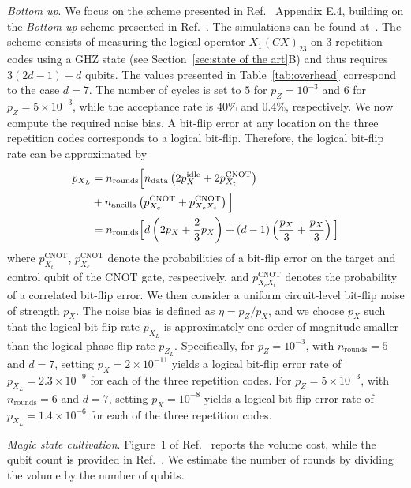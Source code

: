 \documentclass[%
 reprint,
superscriptaddress,
 amsmath,amssymb,
 aps,
]{revtex4-2}
\begin{document}
\textit{Bottom up}. We focus on the scheme presented in Ref.~\cite{gouzien2023performance} Appendix E.4, building on the \textit{Bottom-up} scheme presented in Ref.~\cite{chamberland2022building}. The simulations can be found at~\cite{CodeGithub}. The scheme consists of measuring the logical operator $X_1(CX)_{23}$ on 3 repetition codes using a GHZ state (see Section~\ref{sec:state of the art}B) and thus requires $3(2d-1)+d$ qubits. The values presented in Table~\ref{tab:overhead} correspond to the case $d=7$. The number of cycles is set to $5$ for $p_Z = 10^{-3}$ and $6$ for $p_Z = 5 \times 10^{-3}$, while the acceptance rate is $40\%$ and $0.4\%$, respectively. We now compute the required noise bias. A bit-flip error at any location on the three repetition codes corresponds to a logical bit-flip. Therefore, the logical bit-flip rate can be approximated by
\begin{align}
p_{X_L} &= n_{\text{rounds}} \Big[ 
    n_{\text{data}} \left(2p^\text{idle}_X + 2p^\text{CNOT}_{X_t}\right) \notag \\
&+ n_{\text{ancilla}} \left(p^\text{CNOT}_{X_c} + p^\text{CNOT}_{X_cX_t}\right) 
\Big] \notag \\
&= n_{\text{rounds}} \Big[ 
    d \left(2p_X + \frac{2}{3}p_X\right) 
    + (d-1) \left(\frac{p_X}{3} + \frac{p_X}{3}\right) 
\Big]
\label{eq:logical bitflip}
\end{align}
where $p^\text{CNOT}_{X_t}$, $p^\text{CNOT}_{X_c}$ denote the probabilities of a bit-flip error on the target and control qubit of the CNOT gate, respectively, and $p^\text{CNOT}_{X_cX_t}$ denotes the probability of a correlated bit-flip error. We then consider a uniform circuit-level bit-flip noise of strength $p_X$. The noise bias is defined as $\eta = p_Z / p_X$, and we choose $p_X$ such that the logical bit-flip rate $p_{X_L}$ is approximately one order of magnitude smaller than the logical phase-flip rate $p_{Z_L}$. Specifically, for $p_Z = 10^{-3}$, with $n_{\text{rounds}} = 5$ and $d = 7$, setting $p_X = 2 \times 10^{-11}$ yields a logical bit-flip error rate of $p_{X_L} = 2.3 \times 10^{-9}$ for each of the three repetition codes. For $p_Z = 5 \times 10^{-3}$, with $n_{\text{rounds}} = 6$ and $d = 7$, setting $p_X = 10^{-8}$ yields a logical bit-flip error rate of $p_{X_L} = 1.4 \times 10^{-6}$ for each of the three repetition codes.

\textit{Magic state cultivation}. Figure~1 of Ref.~\cite{gidney2024magic} reports the volume cost, while the qubit count is provided in Ref.~\cite{gidney2024magicZenodo}. We estimate the number of rounds by dividing the volume by the number of qubits.
\end{document}
